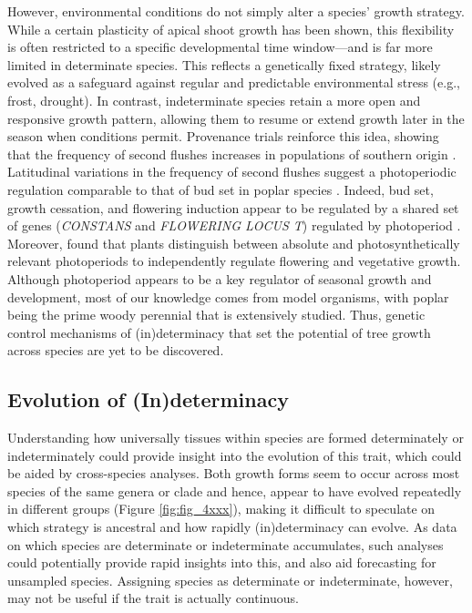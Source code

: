 \documentclass{article}
\begin{document}
	However, environmental conditions do not simply alter a species' growth strategy. While a certain plasticity of apical shoot growth has been shown, this flexibility is often restricted to a specific developmental time window—and is far more limited in determinate species. This reflects a genetically fixed strategy, likely evolved as a safeguard against regular and predictable environmental stress (e.g., frost, drought). In contrast, indeterminate species retain a more open and responsive growth pattern, allowing them to resume or extend growth later in the season when conditions permit. Provenance trials reinforce this idea, showing that the frequency of second flushes increases in populations of southern origin \citep{rudolphLammasGrowthProlepsis1964, soolanayakanahallyTimingPhotoperiodicCompetency2013a}.\\
	
	Latitudinal variations in the frequency of second flushes suggest a photoperiodic regulation comparable to that of bud set in poplar species  \citep{soolanayakanahallyTimingPhotoperiodicCompetency2013a}. Indeed, bud set, growth cessation, and flowering induction appear to be regulated by a shared set of genes (\textit{CONSTANS} and \textit{FLOWERING LOCUS T}) regulated by photoperiod \citep{bohleniusCOFTRegulatory2006a}. Moreover, \citet{wangPlantsDistinguishDifferent2024b} found that plants distinguish between absolute and photosynthetically relevant photoperiods to independently regulate flowering and vegetative growth.  \\
	
	Although photoperiod appears to be a key regulator of seasonal growth and development, most of our knowledge comes from model organisms, with poplar being the prime woody perennial that is extensively studied. Thus, genetic control mechanisms of (in)determinacy that set the potential of tree growth across species are yet to be discovered. \\
	
	
										
	\subsection*{Evolution of (In)determinacy}
	Understanding how universally tissues within species are formed determinately or indeterminately could provide insight into the evolution of this trait, which could be aided by cross-species analyses. Both growth forms seem to occur across most species of the same genera or clade and hence, appear to have evolved repeatedly in different groups (Figure \ref{fig:fig_4xxx}), making it difficult to speculate on which strategy is ancestral \citep[but see][]{hariharanIndeterminateGrowthCould2016} and how rapidly (in)determinacy can evolve. As data on which species are determinate or indeterminate accumulates, such analyses could potentially provide rapid insights into this, and also aid forecasting for unsampled species. Assigning species as determinate or indeterminate, however, may not be useful if the trait is actually continuous. \\
\end{document}
